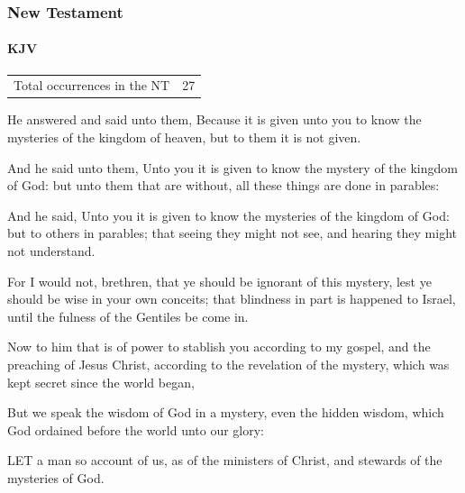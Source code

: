 		
	\subsubsection{New Testament} %
		\label{MYSTERY-NT}
	
		\paragraph{KJV}
			\label{MYSTERY-NT-KJV}
			
	
			\begin{tabular}{ll}
				Total occurrences in the NT & 27
			\end{tabular}
			
			\begin{compactdesc}
				\item[{\hyperref[MATTHEW-13-11]{Matthew 13:11}}] He answered and said unto them, Because it is given unto you to know the mysteries of the kingdom of heaven, but to them it is not given.
				\item[{\hyperref[MARK-4-11]{Mark 4:11}}] And he said unto them, Unto you it is given to know the mystery of the kingdom of God: but unto them that are without, all these things are done in parables:
				\item[{\hyperref[LUKE-8-10]{Luke 8:10}}] And he said, Unto you it is given to know the mysteries of the kingdom of God: but to others in parables; that seeing they might not see, and hearing they might not understand.
				\item[{\hyperref[ROMANS-11-25]{Romans 11:25}}] For I would not, brethren, that ye should be ignorant of this mystery, lest ye should be wise in your own conceits; that blindness in part is happened to Israel, until the fulness of the Gentiles be come in.
				\item[{\hyperref[ROMANS-16-25]{Romans 16:25}}] Now to him that is of power to stablish you according to my gospel, and the preaching of Jesus Christ, according to the revelation of the mystery, which was kept secret since the world began,
				\item[{\hyperref[1CORINTHIANS-2-7]{1 Corinthians 2:7}}] But we speak the wisdom of God in a mystery, even the hidden wisdom, which God ordained before the world unto our glory:
				\item[{\hyperref[1CORINTHIANS-4-1]{1 Corinthians 4:1}}] LET a man so account of us, as of the ministers of Christ, and stewards of the mysteries of God.

\end{compactdesc}
